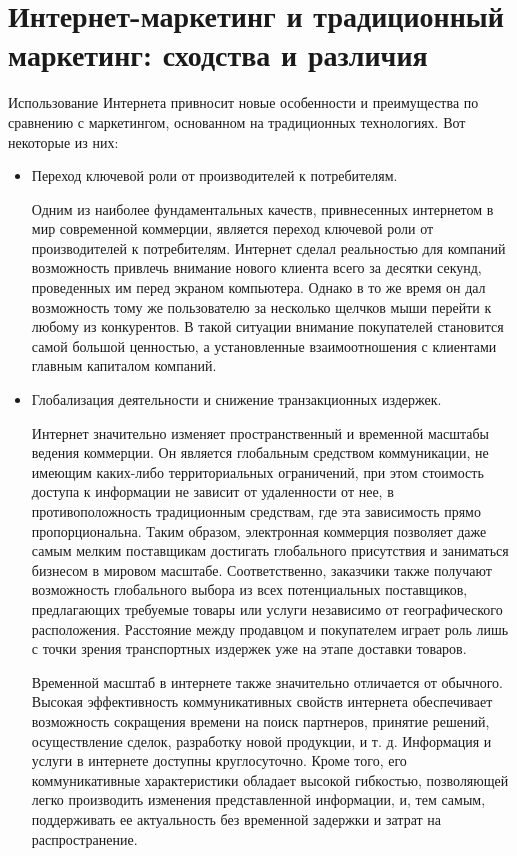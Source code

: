 \documentclass[a4paper,english,russian]{G2-105}
\begin{document}
\section{Интернет-маркетинг и традиционный маркетинг: сходства и различия}
\par Использование Интернета привносит новые особенности и преимущества по сравнению с маркетингом, основанном на традиционных технологиях. Вот некоторые из них:
\begin{itemize}
	\item Переход ключевой роли от производителей к потребителям.
\par Одним из наиболее фундаментальных качеств, привнесенных интернетом в мир современной коммерции, является переход ключевой роли от производителей к потребителям. Интернет сделал реальностью для компаний возможность привлечь внимание нового клиента всего за десятки секунд, проведенных им перед экраном компьютера. Однако в то же время он дал возможность тому же пользователю за несколько щелчков мыши перейти к любому из конкурентов. В такой ситуации внимание покупателей становится самой большой ценностью, а установленные взаимоотношения с клиентами главным капиталом компаний.
	\item Глобализация деятельности и снижение транзакционных издержек.
\par Интернет значительно изменяет пространственный и временной масштабы ведения коммерции. Он является глобальным средством коммуникации, не имеющим каких-либо территориальных ограничений, при этом стоимость доступа к информации не зависит от удаленности от нее, в противоположность традиционным средствам, где эта зависимость прямо пропорциональна. Таким образом, электронная коммерция позволяет даже самым мелким поставщикам достигать глобального присутствия и заниматься бизнесом в мировом масштабе. Соответственно, заказчики также получают возможность глобального выбора из всех потенциальных поставщиков, предлагающих требуемые товары или услуги независимо от географического расположения. Расстояние между продавцом и покупателем играет роль лишь с точки зрения транспортных издержек уже на этапе доставки товаров.
\par Временной масштаб в интернете также значительно отличается от обычного. Высокая эффективность коммуникативных свойств интернета обеспечивает возможность сокращения времени на поиск партнеров, принятие решений, осуществление сделок, разработку новой продукции, и т. д. Информация и услуги в интернете доступны круглосуточно. Кроме того, его коммуникативные характеристики обладает высокой гибкостью, позволяющей легко производить изменения представленной информации, и, тем самым, поддерживать ее актуальность без временной задержки и затрат на распространение.

\end{itemize}
\end{document}
